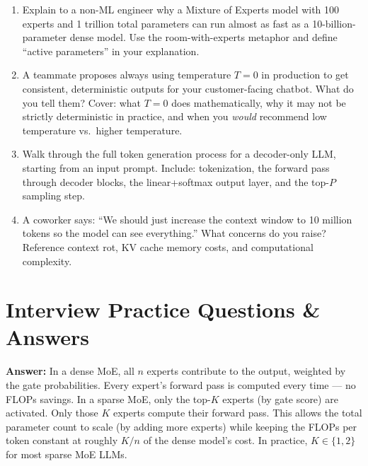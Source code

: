 \documentclass[11pt, a4paper]{article}
\begin{document}
\begin{enumerate}[leftmargin=2em]
  \item Explain to a non-ML engineer why a Mixture of Experts model with 100 experts and 1 trillion total parameters can run almost as fast as a 10-billion-parameter dense model. Use the room-with-experts metaphor and define ``active parameters'' in your explanation.

  \item A teammate proposes always using temperature $T = 0$ in production to get consistent, deterministic outputs for your customer-facing chatbot. What do you tell them? Cover: what $T=0$ does mathematically, why it may not be strictly deterministic in practice, and when you \emph{would} recommend low temperature vs.\ higher temperature.

  \item Walk through the full token generation process for a decoder-only LLM, starting from an input prompt. Include: tokenization, the forward pass through decoder blocks, the linear+softmax output layer, and the top-$P$ sampling step.

  \item A coworker says: ``We should just increase the context window to 10 million tokens so the model can see everything.'' What concerns do you raise? Reference context rot, KV cache memory costs, and computational complexity.
\end{enumerate}

\newpage
\section{Interview Practice Questions \& Answers}

\begin{notebox}
\textbf{Answer:} In a dense MoE, all $n$ experts contribute to the output, weighted by the gate probabilities. Every expert's forward pass is computed every time --- no FLOPs savings. In a sparse MoE, only the top-$K$ experts (by gate score) are activated. Only those $K$ experts compute their forward pass. This allows the total parameter count to scale (by adding more experts) while keeping the FLOPs per token constant at roughly $K/n$ of the dense model's cost. In practice, $K \in \{1, 2\}$ for most sparse MoE LLMs.
\end{notebox}
\end{document}
